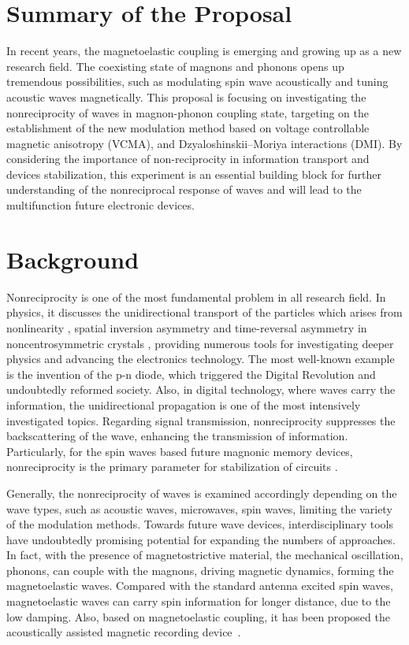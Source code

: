 \section*{Summary of the Proposal}

In recent years, the magnetoelastic coupling is emerging and growing up as a new research field. The coexisting state of magnons and phonons opens up tremendous possibilities, such as modulating spin wave acoustically and tuning acoustic waves magnetically. This proposal is focusing on investigating the nonreciprocity of waves in magnon-phonon coupling state, targeting on the establishment of the new modulation method based on voltage controllable magnetic anisotropy (VCMA), and Dzyaloshinskii–Moriya interactions (DMI). By considering the importance of non-reciprocity in information transport and devices stabilization, this experiment is an essential building block for further understanding of the nonreciprocal response of waves and will lead to the multifunction future electronic devices.

\section*{Background}

Nonreciprocity is one of the most fundamental problem in all research field. In physics, it discusses the unidirectional transport of the particles which arises from nonlinearity \cite{TokuraNagaosaNR2018}, spatial inversion asymmetry and time-reversal asymmetry in noncentrosymmetric crystals \cite{DiNRSW2013,DiNRSW2015}, providing numerous tools for investigating deeper physics and advancing the electronics technology. The most well-known example is the invention of the p-n diode, which triggered the Digital Revolution and undoubtedly reformed society. Also, in digital technology, where waves carry the information, the unidirectional propagation is one of the most intensively investigated topics. Regarding signal transmission, nonreciprocity suppresses the backscattering of the wave, enhancing the transmission of information. Particularly, for the spin waves based future magnonic memory devices, nonreciprocity is the primary parameter for stabilization of circuits \cite{DiNRSW2015}.

Generally, the nonreciprocity of waves is examined accordingly depending on the wave types, such as acoustic waves, microwaves, spin waves, limiting the variety of the modulation methods. Towards future wave devices, interdisciplinary tools have undoubtedly promising potential for expanding the numbers of approaches. In fact, with the presence of magnetostrictive material, the mechanical oscillation, phonons, can couple with the magnons, driving magnetic dynamics, forming the magnetoelastic waves. Compared with the standard antenna excited spin waves, magnetoelastic waves can carry spin information for longer distance, due to the low damping. Also, based on magnetoelastic coupling, it has been proposed the acoustically assisted magnetic recording device~\cite{SampathMS2016}. 

